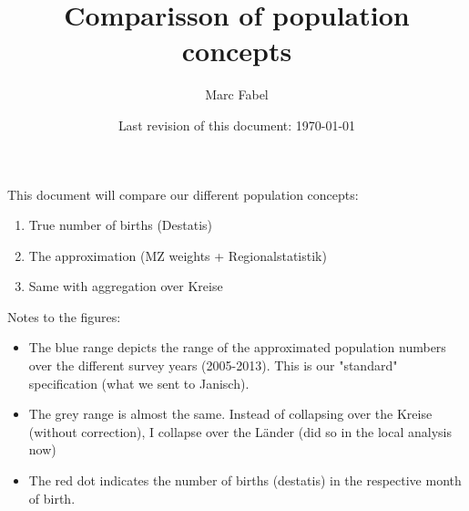 \documentclass[a4paper ]{article}
\author{Marc Fabel}
\title{Comparisson of population concepts}
\date{Last revision of this document: \today}
\begin{document}
\maketitle
This document will compare our different population concepts: 
\begin{enumerate}
\item True number of births (Destatis)
\item The approximation (MZ weights + Regionalstatistik)
\item Same with aggregation over Kreise
\end{enumerate}

\bigskip
Notes to the figures:
\begin{itemize}
\item The blue range depicts the range of the approximated population numbers over the different survey years (2005-2013). This is our "standard" specification (what we sent to Janisch).
\item The grey range is almost the same. Instead of collapsing over the Kreise (without correction), I collapse over the Länder (did so in the local analysis now)
\item The red dot indicates the number of births (destatis) in the respective month of birth. 
\end{itemize}
\end{document}
